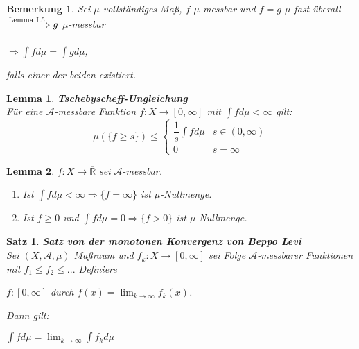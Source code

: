 \documentclass[11pt]{memoir}
\theoremstyle{changebreak}
\newtheorem{Bemerkung}{Bemerkung}[chapter]
\newtheorem{Lemma}{Lemma}[chapter]
\newtheorem{Satz}{Satz}[chapter]
\begin{document}
\begin{Bemerkung}
Sei $\mu$ vollständiges Maß, $f$ $\mu$-messbar und $f = g$ $\mu$-fast überall \\
$\xRightarrow{\text{Lemma I.5}} g$ $\mu$-messbar 
\begin{center}
	$\Rightarrow \int f d\mu = \int g d\mu$, 
\end{center}
falls einer der beiden existiert.
\end{Bemerkung}

\begin{Lemma}
\emph{\textbf{Tschebyscheff-Ungleichung}} \\
Für eine $\mathscr A$-messbare Funktion $f: X \rightarrow [0, \infty]$ mit $\int f d\mu < \infty$ gilt: \\
\begin{equation}
	\mu(\{f \geq s\}) \leq
	\begin{cases}
		\dfrac{1}{s}\int f d\mu & s \in (0, \infty) \\
		0 & s = \infty
	\end{cases}
\end{equation}
\end{Lemma}

\begin{Lemma}
$f: X \rightarrow \overline{\mathbb R}$ sei $\mathscr A$-messbar.
\begin{enumerate}
	\item Ist $\int f d\mu < \infty \Rightarrow \{f = \infty\}$ ist $\mu$-Nullmenge.
	\item Ist $f \geq 0$ und $\int f d\mu = 0 \Rightarrow \{f > 0\}$ ist $\mu$-Nullmenge.
\end{enumerate}
\end{Lemma}




\begin{Satz}
\emph{\textbf{Satz von der monotonen Konvergenz von Beppo Levi}} \\
Sei $(X, \mathscr A, \mu)$ Maßraum und $f_k: X \rightarrow [0, \infty]$ sei Folge $\mathscr A$-messbarer Funktionen mit $f_1 \leq f_2 \leq ...$ Definiere 
\begin{center}
	$f: [0, \infty]$ durch $f(x) = \lim_{k \rightarrow \infty} f_k (x)$. 
\end{center}
Dann gilt:
\begin{center}
	$\int f d\mu = \lim_{k\rightarrow \infty} \int f_k d\mu$
\end{center}
\end{Satz}
\end{document}
